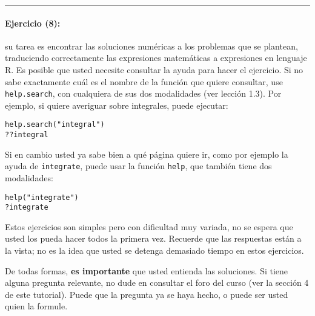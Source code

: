 \documentclass[]{article}
\begin{document}
\begin{center}\rule{3in}{0.4pt}\end{center}

\paragraph{Ejercicio (8):}

su tarea es encontrar las soluciones numéricas a los problemas que se
plantean, traduciendo correctamente las expresiones matemáticas a
expresiones en lenguaje R. Es posible que usted necesite consultar la
ayuda para hacer el ejercicio. Si no sabe exactamente cuál es el nombre
de la función que quiere consultar, use \texttt{help.search}, con
cualquiera de sus dos modalidades (ver lección 1.3). Por ejemplo, si
quiere averiguar sobre integrales, puede ejecutar:

\begin{verbatim}
help.search("integral")
??integral
\end{verbatim}
Si en cambio usted ya sabe bien a qué página quiere ir, como por ejemplo
la ayuda de \texttt{integrate}, puede usar la función \texttt{help}, que
también tiene dos modalidades:

\begin{verbatim}
help("integrate")
?integrate
\end{verbatim}
Estos ejercicios son simples pero con dificultad muy variada, no se
espera que usted los pueda hacer todos la primera vez. Recuerde que las
respuestas están a la vista; no es la idea que usted se detenga
demasiado tiempo en estos ejercicios.

De todas formas, \textbf{es importante} que usted entienda las
soluciones. Si tiene alguna pregunta relevante, no dude en consultar el
foro del curso (ver la sección 4 de este tutorial). Puede que la
pregunta ya se haya hecho, o puede ser usted quien la formule.
\end{document}
